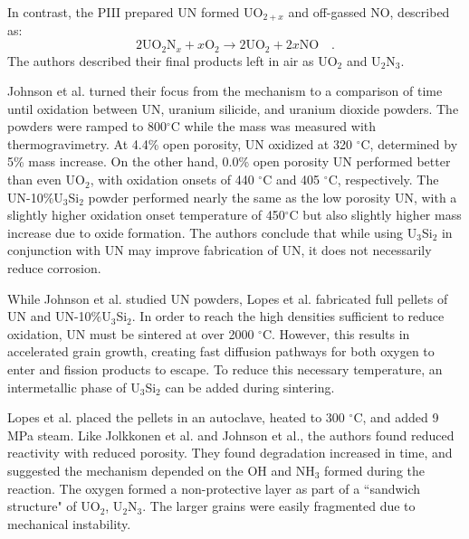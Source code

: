 \documentclass[11pt]{article}
\begin{document}
\begin{multicols}{2}
In contrast, the PIII prepared UN formed UO$_{2+x}$ and off-gassed NO, described as:
\begin{equation}
2\mbox{UO}_{2}\mbox{N}_{x} + x\mbox{O}_{2} \rightarrow 2 \mbox{UO}_{2} + 2x\mbox{NO} \quad .
\end{equation}
The authors described their final products left in air as UO$_{2}$ and U$_{2}$N$_{3}$.
\par 
Johnson et al. \cite{Johnson2016} turned their focus from the mechanism to a comparison of time until oxidation between UN, uranium silicide, and uranium dioxide powders. The powders were ramped to 800$^{\circ}$C while the mass was measured with thermogravimetry. At 4.4\% open porosity, UN oxidized at 320 $^{\circ}$C, determined by 5\% mass increase. On the other hand, 0.0\% open porosity UN performed better than even UO$_{2}$, with oxidation onsets of 440 $^{\circ}$C and 405 $^{\circ}$C, respectively. The UN-10\%U$_{3}$Si$_{2}$ powder performed nearly the same as the low porosity UN, with a slightly higher oxidation onset temperature of 450$^{\circ}$C but also slightly higher mass increase due to oxide formation. The authors conclude that while using U$_{3}$Si$_{2}$ in conjunction with UN may improve fabrication of UN, it does not necessarily reduce corrosion.
\par 
 While Johnson et al. studied UN powders, Lopes et al. \cite{Lopes2017}  fabricated full pellets of UN and UN-10\%U$_{3}$Si$_{2}$. In order to reach the high densities sufficient to reduce oxidation, UN must be sintered at over 2000 $^{\circ}$C. However, this results in accelerated grain growth, creating fast diffusion pathways for both oxygen to enter and fission products to escape. To reduce this necessary temperature, an intermetallic phase of U$_{3}$Si$_{2}$ can be added during sintering.
\par 
Lopes et al. placed the pellets in an autoclave, heated to 300 $^{\circ}$C, and added 9 MPa steam. Like Jolkkonen et al. and Johnson et al., the authors found reduced reactivity with reduced porosity. They found degradation increased in time, and suggested the mechanism depended on the OH and NH$_{3}$ formed during the reaction. The oxygen formed a non-protective layer as part of a ``sandwich structure" of UO$_{2}$, U$_{2}$N$_{3}$. The larger grains were easily fragmented due to mechanical instability.


\end{multicols}
\end{document}
